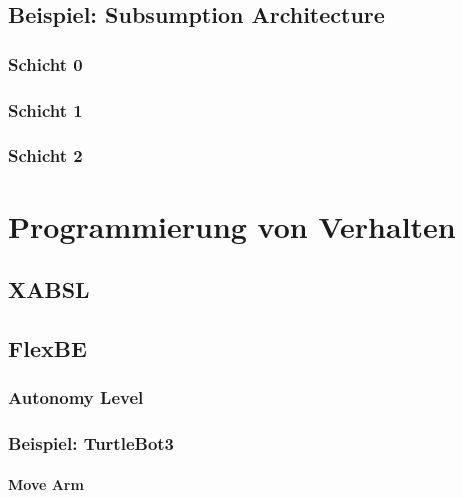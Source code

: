 \documentclass[a4paper, 11pt, accentcolor = tud3b]{tudreport}
\begin{document}
			\subsection{Beispiel: Subsumption Architecture} %

				\subsubsection{Schicht 0} %

				\subsubsection{Schicht 1} %

				\subsubsection{Schicht 2} %

		\section{Programmierung von Verhalten} %

			\subsection{XABSL} %

			\subsection{FlexBE} %

				\subsubsection{Autonomy Level} %

				\subsubsection{Beispiel: TurtleBot3} %

					\paragraph{Move Arm} %
\end{document}
